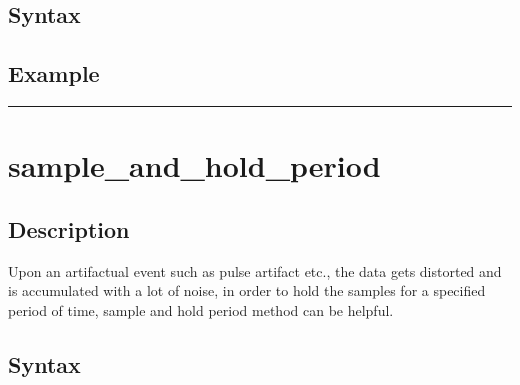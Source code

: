 \documentclass[letterpaper,10pt,english]{sphinxmanual}
\begin{document}
\subsection{Syntax}
\label{\detokenize{4_api_documentation:id46}}
\begin{sphinxVerbatim}[commandchars=\\\{\}]
\end{sphinxVerbatim}


\subsection{Example}
\label{\detokenize{4_api_documentation:id47}}
\begin{sphinxVerbatim}[commandchars=\\\{\}]
\end{sphinxVerbatim}


\bigskip\hrule\bigskip



\section{sample\_and\_hold\_period}
\label{\detokenize{4_api_documentation:sample-and-hold-period}}

\subsection{Description}
\label{\detokenize{4_api_documentation:id48}}
\sphinxAtStartPar
Upon an artifactual event such as pulse artifact etc., the data gets distorted and is accumulated with a lot of noise, in order to hold the samples for a specified period of time, sample and hold period method can be helpful.


\subsection{Syntax}
\label{\detokenize{4_api_documentation:id49}}
\begin{sphinxVerbatim}[commandchars=\\\{\}]
\PYG{p}{[}\PYG{p}{]}
\end{sphinxVerbatim}
\end{document}
